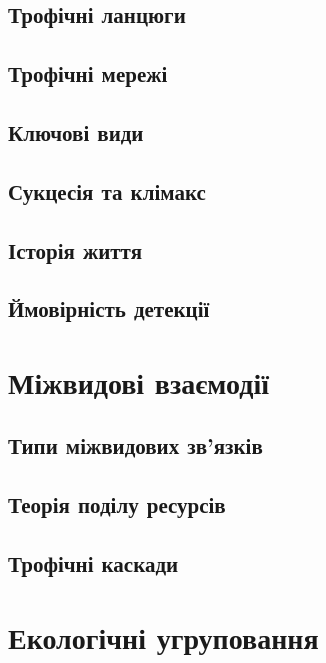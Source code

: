 \documentclass[
  11pt,
]{book}
\begin{document}
\section{Трофічні ланцюги}\label{food-chain}

\section{Трофічні мережі}\label{food-webs}

\section{Ключові види}\label{keystones}

\section{Сукцесія та клімакс}\label{succession}

\section{Історія життя}\label{life-history}

\section{Ймовірність детекції}\label{detectability}

\chapter{Міжвидові взаємодії}\label{interspecific}

\section{Типи міжвидових зв'язків}\label{relationships}

\section{Теорія поділу ресурсів}\label{rstar}

\section{Трофічні каскади}\label{cascade}

\chapter{Екологічні угруповання}\label{comecol}
\end{document}
